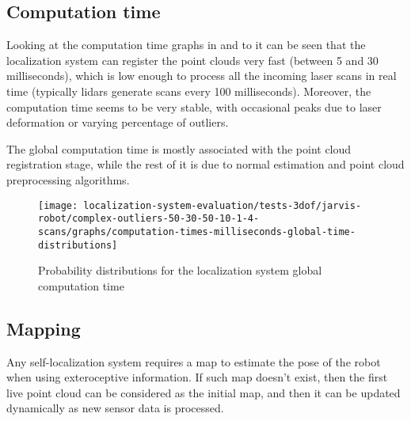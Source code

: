 \subsection{Computation time}

Looking at the computation time graphs in  and to  it can be seen that the localization system can register the point clouds very fast (between 5 and 30 milliseconds), which is low enough to process all the incoming laser scans in real time (typically \glspl{lidar} generate scans every 100 milliseconds). Moreover, the computation time seems to be very stable, with occasional peaks due to laser deformation or varying percentage of outliers.

The global computation time is mostly associated with the point cloud registration stage, while the rest of it is due to normal estimation and point cloud preprocessing algorithms.

\begin{figure}[H]
	\centering
	\texttt{[image: localization-system-evaluation/tests-3dof/jarvis-robot/complex-outliers-50-30-50-10-1-4-scans/graphs/computation-times-milliseconds-global-time-distributions]}
	\caption{Probability distributions for the localization system global computation time}
	\label{fig:localization-system-evaluation_complex-path-with-outliers-50-30-50-10cm-per-sec-velocity-1-4-scans-computation-time}
\end{figure}


\subsection{Mapping}

Any self-localization system requires a map to estimate the pose of the robot when using exteroceptive information. If such map doesn't exist, then the first live point cloud can be considered as the initial map, and then it can be updated dynamically as new sensor data is processed.

